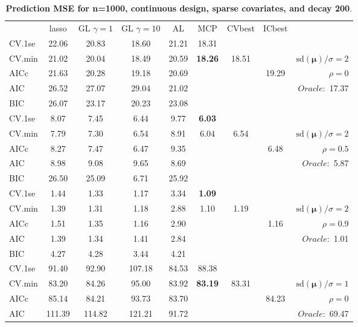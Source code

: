 \clearpage
\begin{table}\vspace{-.5cm}
\caption[l]{ { \bf Prediction MSE for n=1000, continuous design, 
sparse covariates, and  decay  200}.}
\vspace{-.5cm}
\footnotesize{}
\begin{center}
\begin{tabular}{l*{7}{c}|r}
 & lasso & GL $\gamma=1$ & GL $\gamma=10$ & AL & MCP  & CVbest & ICbest  \\
\cline{1-9}
CV.1se & 22.06 & 20.83 & 18.60 & 21.21 & 18.31 & & & \\
CV.min & 21.02 & 20.04 & 18.49 & 20.59 & {\bf 18.26} & 18.51 & & $\mathrm{sd}(\mathbf{\mu})/\sigma=2$ \\
AICc & 21.63 & 20.28 & 19.18 & 20.69 & & & 19.29 &  $\rho=0$ \\
AIC & 26.52 & 27.07 & 29.04 & 21.02 & & & &  \multirow{2}{*}{$Oracle: $ 17.37} \\
BIC & 26.07 & 23.17 & 20.23 & 23.08 & & & &  \\
 \hline 
CV.1se & 8.07 & 7.45 & 6.44 & 9.77 & {\bf 6.03} & & & \\
CV.min & 7.79 & 7.30 & 6.54 & 8.91 & 6.04 & 6.54 & & $\mathrm{sd}(\mathbf{\mu})/\sigma=2$ \\
AICc & 8.27 & 7.47 & 6.47 & 9.35 & & & 6.48 &  $\rho=0.5$ \\
AIC & 8.98 & 9.08 & 9.65 & 8.69 & & & &  \multirow{2}{*}{$Oracle: $ 5.87} \\
BIC & 26.50 & 25.09 & 6.71 & 25.92 & & & &  \\
 \hline 
CV.1se & 1.44 & 1.33 & 1.17 & 3.34 & {\bf 1.09} & & & \\
CV.min & 1.39 & 1.31 & 1.18 & 2.88 & 1.10 & 1.19 & & $\mathrm{sd}(\mathbf{\mu})/\sigma=2$ \\
AICc & 1.51 & 1.35 & 1.16 & 2.90 & & & 1.16 &  $\rho=0.9$ \\
AIC & 1.39 & 1.34 & 1.41 & 2.84 & & & &  \multirow{2}{*}{$Oracle: $ 1.01} \\
BIC & 4.27 & 4.28 & 3.44 & 4.21 & & & &  \\
 \hline 
CV.1se & 91.40 & 92.90 & 107.18 & 84.53 & 88.38 & & & \\
CV.min & 83.20 & 84.26 & 95.00 & 83.92 & {\bf 83.19} & 83.31 & & $\mathrm{sd}(\mathbf{\mu})/\sigma=1$ \\
AICc & 85.14 & 84.21 & 93.73 & 83.70 & & & 84.23 &  $\rho=0$ \\
AIC & 111.39 & 114.82 & 121.21 & 91.72 & & & &  \multirow{2}{*}{$Oracle: $ 69.47} \\

\end{tabular}
\end{center}
\end{table}
